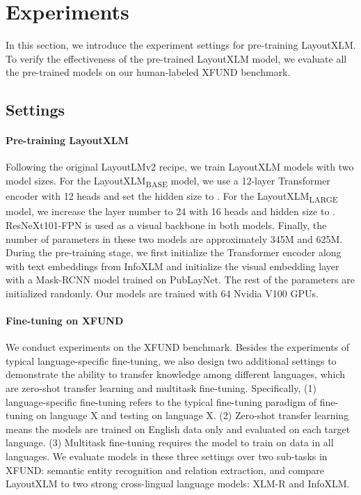 \documentclass[11pt]{article}
\newcommand{\task}{\textsc{XFUND}\xspace}
\begin{document}
\section{Experiments}
In this section, we introduce the experiment settings for pre-training LayoutXLM. To verify the effectiveness of the pre-trained LayoutXLM model, we evaluate all the pre-trained models on our human-labeled \task benchmark.

\subsection{Settings}
\paragraph{Pre-training LayoutXLM}
Following the original LayoutLMv2 recipe, we train LayoutXLM models with two model sizes. For the LayoutXLM\textsubscript{BASE} model, we use a 12-layer Transformer encoder with 12 heads and set the hidden size to . For the LayoutXLM\textsubscript{LARGE} model, we increase the layer number to 24 with 16 heads and hidden size to . ResNeXt101-FPN is used as a visual backbone in both models. Finally, the number of parameters in these two models are approximately 345M and 625M.
During the pre-training stage, we first initialize the Transformer encoder along with text embeddings from InfoXLM and initialize the visual embedding layer with a Mask-RCNN model trained on PubLayNet. The rest of the parameters are initialized randomly. Our models are trained with 64 Nvidia V100 GPUs.

\paragraph{Fine-tuning on \task}
We conduct experiments on the XFUND benchmark. Besides the experiments of typical language-specific fine-tuning, we also design two additional settings to demonstrate the ability to transfer knowledge among different languages, which are zero-shot transfer learning and multitask fine-tuning. Specifically, (1) language-specific fine-tuning refers to the typical fine-tuning paradigm of fine-tuning on language X and testing on language X. (2) Zero-shot transfer learning means the models are trained on English data only and evaluated on each target language. (3) Multitask fine-tuning requires the model to train on data in all languages. We evaluate models in these three settings over two sub-tasks in \task: semantic entity recognition and relation extraction, and compare LayoutXLM to two strong cross-lingual language models: XLM-R and InfoXLM. 
\end{document}
